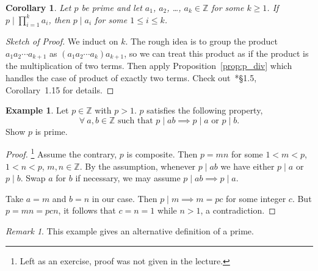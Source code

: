 \documentclass{amsbook}
\theoremstyle{plain}
\newtheorem{corollary}[theorem]{Corollary}
\theoremstyle{definition}
\newtheorem{example}[theorem]{Example}
\theoremstyle{remark}
\newtheorem{remark}[theorem]{Remark}
\numberwithin{equation}{chapter}
\numberwithin{figure}{chapter}
\begin{document}
\begin{corollary}\label{cor:p_div}
Let $p$ be prime and let $a_1$, $a_2$, \ldots, $a_k \in \mathbb{Z}$ for some $k \geqslant 1$. If $p \mid \prod_{i = 1}^k a_i$, then $p \mid a_i$ for some $1 \leqslant i \leqslant k$.
\end{corollary}
\begin{proof}[Sketch of Proof]\renewcommand*{\qedsymbol}{\ensuremath{\blacksquare}}
We induct on $k$. The rough idea is to group the product $a_1a_2 \cdots a_{k+1}$ as $(a_1a_2 \cdots a_k)a_{k+1}$, so we can treat this product as if the product is the multiplication of two terms. Then apply Proposition~\ref{prop:p_div} which handles the case of product of exactly two terms. Check out~\cite{Strayer2001}*{\S 1.5, Corollary~1.15} for details.
\end{proof}

\begin{example}
Let $p \in \mathbb{Z}$ with $p > 1$. $p$ satisfies the following property,
\[
\forall~ a, b \in \mathbb{Z} \text{ such that } p \mid ab \implies p \mid a \text{ or } p \mid b. 
\]
Show $p$ is prime.
\end{example}
\begin{proof}\footnote{Left as an exercise, proof was not given in the lecture.}
Assume the contrary, $p$ is composite. Then $p = mn$ for some $1 < m < p$, $1 < n < p$, $m, n \in \mathbb{Z}$. By the assumption, whenever $p \mid ab $ we have either $p \mid a$ or $p \mid b$. Swap $a$ for $b$ if necessary, we may assume $p \mid ab \implies p \mid a$. 

Take $a = m$ and $b = n$ in our case. Then $p \mid m \implies m = pc$ for some integer $c$. But $p = mn = pcn$, it follows that $c = n = 1$ while $n > 1$, a contradiction.
\end{proof}
\begin{remark}
This example gives an alternative definition of a prime.
\end{remark}
\end{document}
